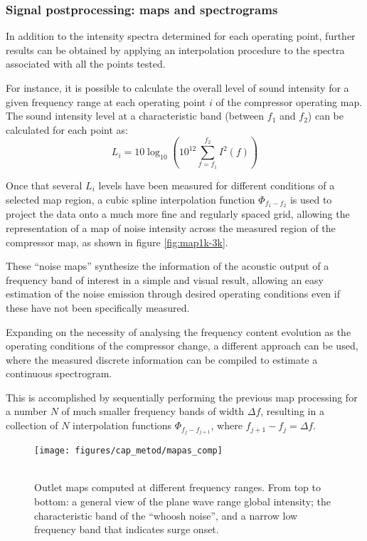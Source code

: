 \subsubsection{Signal postprocessing: maps and spectrograms}
\label{sub:noise_maps_and_spectrograms}

In addition to the intensity spectra determined for each operating point, further results can be obtained by applying an interpolation procedure to the spectra associated with all the points tested.

For instance, it is possible to calculate the overall level of sound intensity for a given frequency range at each operating point $i$ of the compressor operating map. The sound intensity level at a characteristic band (between $f_1$ and $f_2$) can be calculated for each point as:
\begin{equation}\label{eq:point_level}
  L_i=10\log_{10}\left(10^{12}\sum_{f=f_1}^{f_2}I^2(f)\right)
\end{equation}

Once that several $L_i$ levels have been measured for different conditions of a selected map region, a cubic spline interpolation function $\Phi_{f_1-f_2}$ is used to project the data onto a much more fine and regularly spaced grid, allowing the representation of a map of noise intensity across the measured region of the compressor map, as shown in figure \ref{fig:map1k-3k}.

These ``noise maps'' synthesize the information of the acoustic output of a frequency band of interest in a simple and visual result, allowing an easy estimation of the noise emission through desired operating conditions even if these have not been specifically measured.

Expanding on the necessity of analysing the frequency content evolution as the operating conditions of the compressor change, a different approach can be used, where the measured discrete information can be compiled to estimate a continuous spectrogram.

This is accomplished by sequentially performing the previous map processing for a number $N$ of much smaller frequency bands of width $\Delta f$, resulting in a collection of $N$ interpolation functions $\Phi_{f_j-f_{j+1}}$, where $f_{j+1}-f_j = \Delta f$.

\begin{wrapfigure}[36]{O}[1.6cm]{0.41\textwidth}
\vspace{-5mm}
\texttt{[image: figures/cap\_metod/mapas\_comp]}
\caption{\null\\Outlet maps computed at different frequency ranges. From top to bottom: a general view of the plane wave range global intensity; the characteristic band of the ``whoosh noise'', and a narrow low frequency band that indicates surge onset.}
\label{fig:mapas_comp}
\end{wrapfigure}

